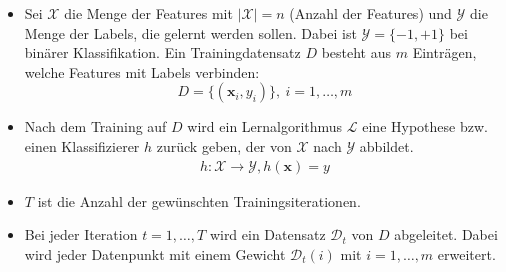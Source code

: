 \begin{itemize}
    \item Sei $\mathcal{X}$ die Menge der Features mit $\left|\mathcal{X}\right| = n$
          (Anzahl der Features) und $\mathcal{Y}$ die Menge der Labels, die gelernt werden sollen.
          Dabei ist $\mathcal{Y}=\{-1, +1\}$ bei binärer Klassifikation. Ein Trainingdatensatz $D$ besteht aus $m$ Einträgen,
          welche Features mit Labels verbinden:
          $$
              D=\{(\boldsymbol{x}_i, y_i)\},~i=1, \dots, m
          $$
    \item Nach dem Training auf $D$ wird ein Lernalgorithmus $\mathcal{L}$ eine Hypothese bzw. einen Klassifizierer
          $h$ zurück geben, der von $\mathcal{X}$ nach $\mathcal{Y}$ abbildet.
          \begin{align*}
              h:\mathcal{X} \rightarrow \mathcal{Y}, h(\boldsymbol{x}) = y
          \end{align*}
    \item $T$ ist die Anzahl der gewünschten Trainingsiterationen.
    \item Bei jeder Iteration $t=1, \dots,T$ wird ein Datensatz $\mathcal{D}_t$ von $D$ abgeleitet. Dabei wird
          jeder Datenpunkt mit einem Gewicht $\mathcal{D}_t(i)$ mit $i=1, \dots, m$ erweitert.
\end{itemize}
